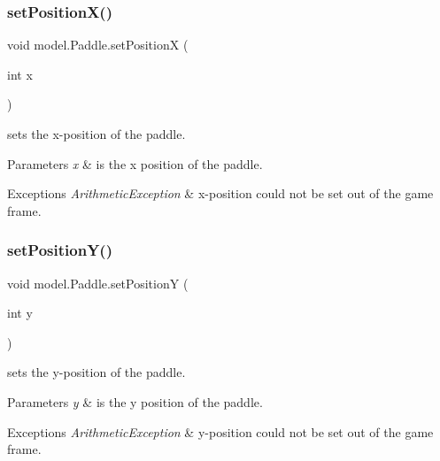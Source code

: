 \subsubsection{\texorpdfstring{set\+Position\+X()}{setPositionX()}}
{\footnotesize\ttfamily void model.\+Paddle.\+set\+PositionX (\begin{DoxyParamCaption}\item[{int}]{x }\end{DoxyParamCaption})}



sets the x-\/position of the paddle. 


\begin{DoxyParams}{Parameters}
{\em x} & is the x position of the paddle. \\
\hline
\end{DoxyParams}

\begin{DoxyExceptions}{Exceptions}
{\em Arithmetic\+Exception} & x-\/position could not be set out of the game frame. \\
\hline
\end{DoxyExceptions}
\hypertarget{classmodel_1_1_paddle_a10161bfb478bcdeaf8fbfdac544c10f8}{}\label{classmodel_1_1_paddle_a10161bfb478bcdeaf8fbfdac544c10f8} 
\subsubsection{\texorpdfstring{set\+Position\+Y()}{setPositionY()}}
{\footnotesize\ttfamily void model.\+Paddle.\+set\+PositionY (\begin{DoxyParamCaption}\item[{int}]{y }\end{DoxyParamCaption})}



sets the y-\/position of the paddle. 


\begin{DoxyParams}{Parameters}
{\em y} & is the y position of the paddle. \\
\hline
\end{DoxyParams}

\begin{DoxyExceptions}{Exceptions}
{\em Arithmetic\+Exception} & y-\/position could not be set out of the game frame. \\
\hline
\end{DoxyExceptions}


